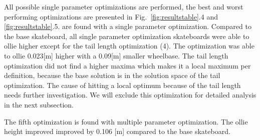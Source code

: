 \documentclass[default,iicol]{sn-jnl}
\begin{document}

All possible single parameter optimizations are performed, the best and worst performing optimizations are presented in Fig.~\ref{fig:resultstable}.4 and \ref{fig:resultstable}.5. are found with a single parameter optimization. Compared to the base skateboard, all single parameter optimization skateboards were able to ollie higher except for the tail length optimization (4). The optimization was able to ollie 0.023[m] higher with a 0.09[m] smaller wheelbase. The tail length optimization did not find a higher maxima which makes it a local maximum per definition, because the base solution is in the solution space of the tail optimization. The cause of hitting a local optimum because of the tail length needs further investigation. We will exclude this optimization for detailed analysis in the next subsection.

The fifth optimization is found with multiple parameter optimization. The ollie height improved improved by 0.106 [m] compared to the base skateboard. 

\end{document}
